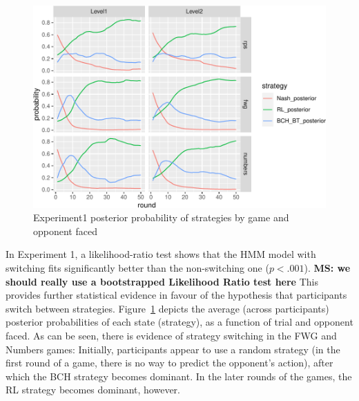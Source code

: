 \documentclass[
  english,
  man,floatsintext]{apa6}
\begin{document}
\begin{figure}

{\centering \includegraphics{paper_draft_2021_files/figure-latex/exp1-posteriors-plot-1} 

}

\caption{Experiment1 posterior probability of strategies by game and opponent faced}\label{fig:exp1-posteriors-plot}
\end{figure}

In Experiment 1, a likelihood-ratio test shows that the HMM model with switching fits significantly better than the non-switching one (\(p < .001\)). \textbf{MS: we should really use a bootstrapped Likelihood Ratio test here } This provides further statistical evidence in favour of the hypothesis that participants switch between strategies. Figure~\ref{fig:exp1-posteriors-plot} depicts the average (across participants) posterior probabilities of each state (strategy), as a function of trial and opponent faced. As can be seen, there is evidence of strategy switching in the FWG and Numbers games: Initially, participants appear to use a random strategy (in the first round of a game, there is no way to predict the opponent's action), after which the BCH strategy becomes dominant. In the later rounds of the games, the RL strategy becomes dominant, however.
\end{document}
